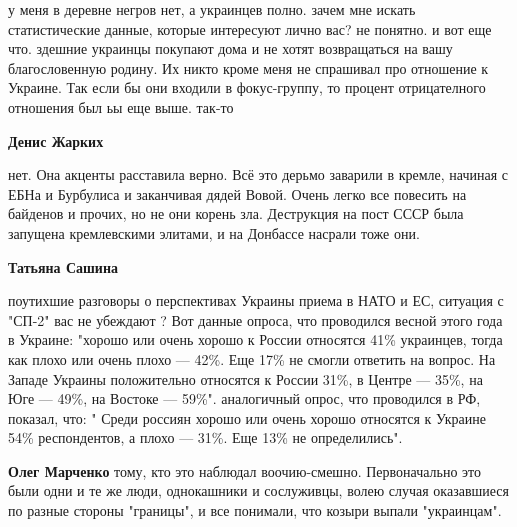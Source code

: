 \begin{itemize}
\begin{itemize}
у меня в деревне негров нет, а украинцев полно. зачем мне искать статистические
данные, которые интересуют лично вас? не понятно. и вот еще что. здешние
украинцы покупают дома и не хотят возвращаться на вашу благословенную родину.
Их никто кроме меня не спрашивал про отношение к Украине. Так если бы они
входили в фокус-группу, то процент отрицателного отношения был ьы еще выше.
так-то

 
\textbf{Денис Жарких} 

нет. Она акценты расставила верно. Всё это дерьмо заварили в кремле, начиная с
ЕБНа и Бурбулиса и заканчивая дядей Вовой. Очень легко все повесить на байденов
и прочих, но не они корень зла. Деструкция на пост СССР была запущена
кремлевскими элитами, и на Донбассе насрали тоже они.


 
\textbf{Татьяна Сашина} 

поутихшие разговоры о перспективах Украины приема в НАТО и ЕС, ситуация с
"СП-2" вас не убеждают ? Вот данные опроса, что проводился весной этого года в
Украине: "хорошо или очень хорошо к России относятся 41\% украинцев, тогда как
плохо или очень плохо — 42\%. Еще 17\% не смогли ответить на вопрос. На Западе
Украины положительно относятся к России 31\%, в Центре — 35\%, на Юге — 49\%, на
Востоке — 59\%".  аналогичный опрос, что проводился в РФ, показал, что: " Среди
россиян хорошо или очень хорошо относятся к Украине 54\% респондентов, а плохо —
31\%. Еще 13\% не определились".

 
\textbf{Олег Марченко} тому, кто это наблюдал воочию-смешно. Первоначально это были одни и те же люди, однокашники и сослуживцы, волею случая оказавшиеся по разные стороны "границы", и все понимали, что козыри выпали "украинцам".


\end{itemize}
\end{itemize}
